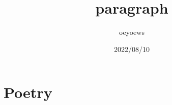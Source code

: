 \documentclass{ctexart}
\title{paragraph}
\author{oeyoews}
\date{2022/08/10}
\begin{document}
\maketitle

\section{Poetry}%
\label{sec:Paragraph}


%
%
\end{document}
